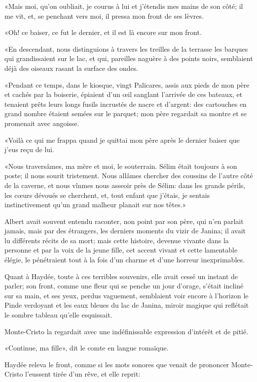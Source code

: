 «Mais moi, qu'on oubliait, je courus à lui et j'étendis mes mains de son côté; il me vit, et, se penchant vers moi, il pressa mon front de ses lèvres. 

«Oh! ce baiser, ce fut le dernier, et il est là encore sur mon front. 

«En descendant, nous distinguions à travers les treilles de la terrasse les barques qui grandissaient sur le lac, et qui, pareilles naguère à des points noirs, semblaient déjà des oiseaux rasant la surface des ondes.  

«Pendant ce temps, dans le kiosque, vingt Palicares, assis aux pieds de mon père et cachés par la boiserie, épiaient d'un œil sanglant l'arrivée de ces bateaux, et tenaient prêts leurs longs fusils incrustés de nacre et d'argent: des cartouches en grand nombre étaient semées sur le parquet; mon père regardait sa montre et se promenait avec angoisse. 

«Voilà ce qui me frappa quand je quittai mon père après le dernier baiser que j'eus reçu de lui. 

«Nous traversâmes, ma mère et moi, le souterrain. Sélim était toujours à son poste; il nous sourit tristement. Nous allâmes chercher des coussins de l'autre côté de la caverne, et nous vînmes nous asseoir près de Sélim: dans les grands périls, les cœurs dévoués se cherchent, et, tout enfant que j'étais, je sentais instinctivement qu'un grand malheur planait sur nos têtes.» 

Albert avait souvent entendu raconter, non point par son père, qui n'en parlait jamais, mais par des étrangers, les derniers moments du vizir de Janina; il avait lu différents récits de sa mort; mais cette histoire, devenue vivante dans la personne et par la voix de la jeune fille, cet accent vivant et cette lamentable élégie, le pénétraient tout à la fois d'un charme et d'une horreur inexprimables. 

Quant à Haydée, toute à ces terribles souvenirs, elle avait cessé un instant de parler; son front, comme une fleur qui se penche un jour d'orage, s'était incliné sur sa main, et ses yeux, perdus vaguement, semblaient voir encore à l'horizon le Pinde verdoyant et les eaux bleues du lac de Janina, miroir magique qui reflétait le sombre tableau qu'elle esquissait. 

Monte-Cristo la regardait avec une indéfinissable expression d'intérêt et de pitié. 

«Continue, ma fille», dit le comte en langue romaïque. 

Haydée releva le front, comme si les mots sonores que venait de prononcer Monte-Cristo l'eussent tirée d'un rêve, et elle reprit: 

